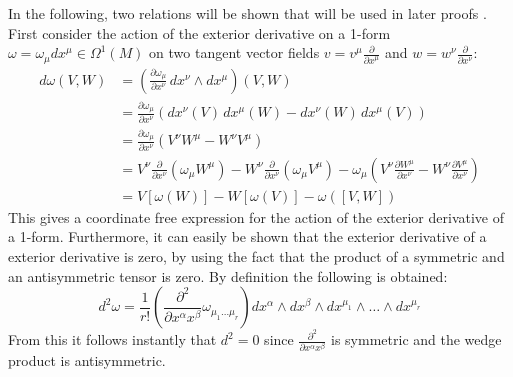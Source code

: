 In the following, two relations will be shown that will be used in later proofs \cite{NakaharaGeometrytopologyphysics2005}. First consider the action of the exterior derivative on a 1-form $\omega=\omega_\mu dx^\mu \in \Omega^1(M)$ on two tangent vector fields $v=v^\mu\frac{\partial}{\partial x^\mu}$ and $w=w^\nu\frac{\partial}{\partial x^\nu}$:
\begin{align*}
  d\omega(V, W) 
  &= \left( \frac{\partial \omega_\mu}{\partial x^\nu} \, dx^\nu \wedge dx^\mu \right)(V, W) \\
  &= \frac{\partial \omega_\mu}{\partial x^\nu} 
  \left( dx^\nu(V) \, dx^\mu(W) - dx^\nu(W) \, dx^\mu(V) \right) \\
  &= \frac{\partial \omega_\mu}{\partial x^\nu} 
  \left( V^\nu W^\mu - W^\nu V^\mu \right) \\
  &= V^\nu \frac{\partial}{\partial x^\nu} \left( \omega_\mu W^\mu \right)
  - W^\nu \frac{\partial}{\partial x^\nu} \left( \omega_\mu V^\mu \right)
  - \omega_\mu \left( V^\nu \frac{\partial W^\mu}{\partial x^\nu} - W^\nu \frac{\partial V^\mu}{\partial x^\nu} \right) \\
  &= V[\omega(W)] - W[\omega(V)] - \omega([V, W])
\end{align*}
This gives a coordinate free expression for the action of the exterior derivative of a 1-form. Furthermore, it can easily be shown that the exterior derivative of a exterior derivative is zero, by using the fact that the product of a symmetric and an antisymmetric tensor is zero. By definition the following is obtained:
\[ d^2\omega = \frac{1}{r!}\left( \frac{\partial^2}{ \partial x^\alpha x^\beta} \omega_{\mu_1 \dots \mu_r} \right) dx^\alpha \wedge dx^\beta \wedge dx^{\mu_1} \wedge \dots \wedge dx^{\mu_r} \]
From this it follows instantly that $d^2=0$ since $\frac{\partial^2}{ \partial x^\alpha x^\beta}$ is symmetric and the wedge product is antisymmetric.


